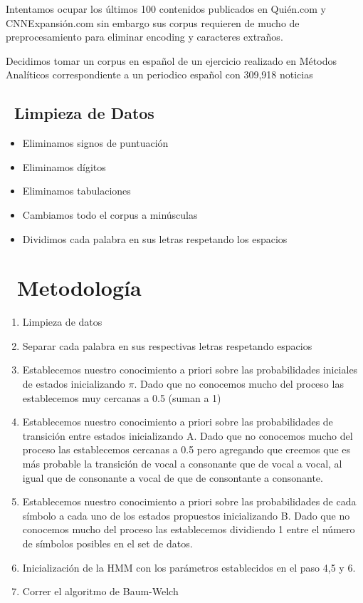 \documentclass[]{article}
\begin{document}
Intentamos ocupar los últimos 100 contenidos publicados en Quién.com y
CNNExpansión.com sin embargo sus corpus requieren de mucho de
preprocesamiento para eliminar encoding y caracteres extraños.

Decidimos tomar un corpus en español de un ejercicio realizado en
Métodos Analíticos correspondiente a un periodico español con 309,918
noticias

\subsection{~Limpieza de Datos}\label{limpieza-de-datos}

\begin{itemize}
\itemsep1pt\parskip0pt
\item
  Eliminamos signos de puntuación
\item
  Eliminamos dígitos
\item
  Eliminamos tabulaciones
\item
  Cambiamos todo el corpus a minúsculas
\item
  Dividimos cada palabra en sus letras respetando los espacios
\end{itemize}

\section{~Metodología}\label{metodologia}

\begin{enumerate}
\def\labelenumi{\arabic{enumi}.}
\itemsep1pt\parskip0pt
\item
  Limpieza de datos
\item
  Separar cada palabra en sus respectivas letras respetando espacios
\item
  Establecemos nuestro conocimiento a priori sobre las probabilidades
  iniciales de estados inicializando \(\pi\). Dado que no conocemos
  mucho del proceso las establecemos muy cercanas a 0.5 (suman a 1)
\item
  Establecemos nuestro conocimiento a priori sobre las probabilidades de
  transición entre estados inicializando A. Dado que no conocemos mucho
  del proceso las establecemos cercanas a 0.5 pero agregando que creemos
  que es más probable la transición de vocal a consonante que de vocal a
  vocal, al igual que de consonante a vocal de que de consontante a
  consonante.
\item
  Establecemos nuestro conocimiento a priori sobre las probabilidades de
  cada símbolo a cada uno de los estados propuestos inicializando B.
  Dado que no conocemos mucho del proceso las establecemos dividiendo 1
  entre el número de símbolos posibles en el set de datos.
\item
  Inicialización de la HMM con los parámetros establecidos en el paso
  4,5 y 6.
\item
  Correr el algoritmo de Baum-Welch
\end{enumerate}
\end{document}
